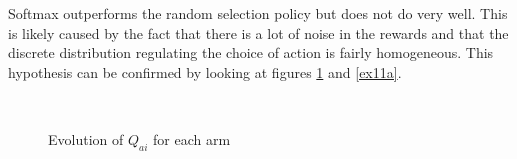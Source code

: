 \documentclass[a4paper]{article}
\begin{document}
Softmax outperforms the random selection policy but does not do very well. 
This is likely caused by the fact that there is a lot of noise in the rewards
and that the discrete distribution regulating the choice of action is fairly
homogeneous. This hypothesis can be confirmed by looking at figures 
\ref{ex11q} and \ref{ex11a}.

\begin{figure}[H]
	\centering
	\\
	\caption{Evolution of $Q_{ai}$ for each arm}
	\label{ex11q}
\end{figure}
\end{document}
